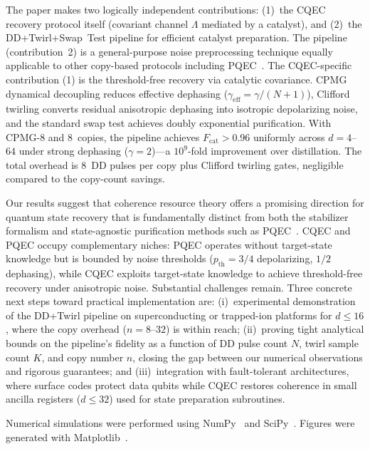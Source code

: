 \documentclass[prx,twocolumn,superscriptaddress,longbibliography,floatfix]{revtex4-2}
\begin{document}
The paper makes two logically independent contributions: (1)~the CQEC recovery protocol itself (covariant channel $\Lambda$ mediated by a catalyst), and (2)~the DD+Twirl+Swap~Test pipeline for efficient catalyst preparation.
The pipeline (contribution~2) is a general-purpose noise preprocessing technique equally applicable to other copy-based protocols including PQEC~\cite{Raghoonanan2026}.
The CQEC-specific contribution (1) is the threshold-free recovery via catalytic covariance.
CPMG dynamical decoupling reduces effective dephasing ($\gamma_\mathrm{eff} = \gamma/(N+1)$), Clifford twirling converts residual anisotropic dephasing into isotropic depolarizing noise, and the standard swap test achieves doubly exponential purification.
With CPMG-8 and 8~copies, the pipeline achieves $F_\mathrm{cat} > 0.96$ uniformly across $d = 4$--$64$ under strong dephasing ($\gamma = 2$)---a $10^9$-fold improvement over distillation.
The total overhead is 8~DD pulses per copy plus Clifford twirling gates, negligible compared to the copy-count savings.

Our results suggest that coherence resource theory offers a promising direction for quantum state recovery that is fundamentally distinct from both the stabilizer formalism and state-agnostic purification methods such as PQEC~\cite{Raghoonanan2026}.
CQEC and PQEC occupy complementary niches: PQEC operates without target-state knowledge but is bounded by noise thresholds ($p_\mathrm{th} = 3/4$ depolarizing, $1/2$ dephasing), while CQEC exploits target-state knowledge to achieve threshold-free recovery under anisotropic noise.
Substantial challenges remain.
Three concrete next steps toward practical implementation are:
(i)~experimental demonstration of the DD+Twirl pipeline on superconducting or trapped-ion platforms for $d \leq 16$, where the copy overhead ($n = 8$--$32$) is within reach;
(ii)~proving tight analytical bounds on the pipeline's fidelity as a function of DD pulse count $N$, twirl sample count $K$, and copy number $n$, closing the gap between our numerical observations and rigorous guarantees;
and (iii)~integration with fault-tolerant architectures, where surface codes protect data qubits while CQEC restores coherence in small ancilla registers ($d \leq 32$) used for state preparation subroutines.


\begin{acknowledgments}
Numerical simulations were performed using NumPy~\cite{numpy2020} and SciPy~\cite{scipy2020}.
Figures were generated with Matplotlib~\cite{Hunter2007}.
\end{acknowledgments}
\end{document}

